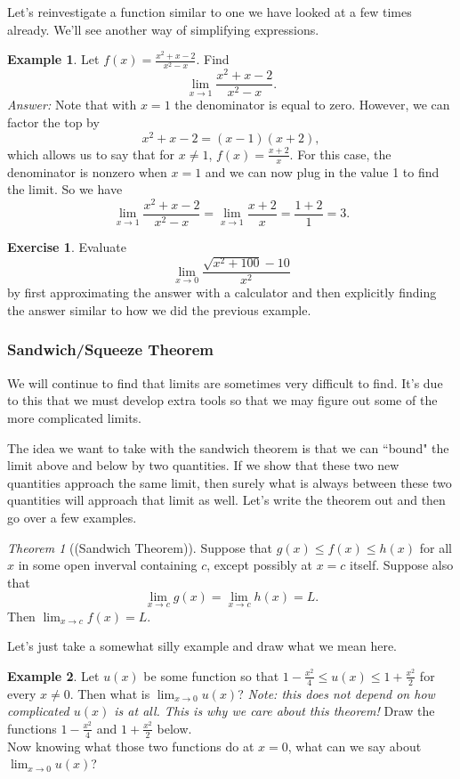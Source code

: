 \documentclass[leqno]{article}
\theoremstyle{definition}
\newtheorem{example}{Example}[section]
\newtheorem{exercise}{Exercise}[section]
\theoremstyle{remark}
\theoremstyle{theorem}
\newtheorem{theorem}{Theorem}[section]
\begin{document}
Let's reinvestigate a function similar to one we have looked at a few times already. We'll see another way of simplifying expressions.

\begin{example}
Let $f(x)=\frac{x^2+x-2}{x^2-x}$. Find 
\[
\lim_{x\to 1} \frac{x^2+x-2}{x^2-x}.
\]
\noindent \emph{Answer:} Note that with $x=1$ the denominator is equal to zero.  However, we can factor the top by
\[
x^2+x-2=(x-1)(x+2),
\]
which allows us to say that for $x\neq 1$, $f(x)=\frac{x+2}{x}$.  For this case, the denominator is nonzero when $x=1$ and we can now plug in the value 1 to find the limit. So we have
\[
\lim_{x\to 1} \frac{x^2+x-2}{x^2-x}=\lim_{x\to 1} \frac{x+2}{x}=\frac{1+2}{1}=3.
\]
\end{example}

\begin{exercise}
Evaluate 
\[
\lim_{x\to 0} \frac{\sqrt{x^2+100}-10}{x^2}
\]
by first approximating the answer with a calculator and then explicitly finding the answer similar to how we did the previous example.
\end{exercise}

\subsubsection{Sandwich/Squeeze Theorem}

We will continue to find that limits are sometimes very difficult to find.  It's due to this that we must develop extra tools so that we may figure out some of the more complicated limits.  

The idea we want to take with the sandwich theorem is that we can ``bound" the limit above and below by two quantities.  If we show that these two new quantities approach the same limit, then surely what is always between these two quantities will approach that limit as well. Let's write the theorem out and then go over a few examples.

\begin{theorem}[(Sandwich Theorem)]
Suppose that $g(x)\leq f(x)\leq h(x)$ for all $x$ in some open inverval containing $c$, except possibly at $x=c$ itself. Suppose also that
\[
\lim_{x\to c}g(x)=\lim_{x\to c}h(x)=L.
\]
Then $\lim_{x\to c} f(x)=L$.  
\end{theorem}

Let's just take a somewhat silly example and draw what we mean here.

\begin{example}
Let $u(x)$ be some function so that $1-\frac{x^2}{4}\leq u(x) \leq 1+\frac{x^2}{2}$ for every $x\neq 0$. Then what is $\lim_{x\to 0} u(x)$? \emph{Note: this does not depend on how complicated $u(x)$ is at all.  This is why we care about this theorem!} Draw the functions $1-\frac{x^2}{4}$ and $1+\frac{x^2}{2}$ below.
\vspace*{5cm}\\
Now knowing what those two functions do at $x=0$, what can we say about $\lim_{x\to 0}u(x)$?
\vspace*{2cm}
\end{example}
\end{document}
